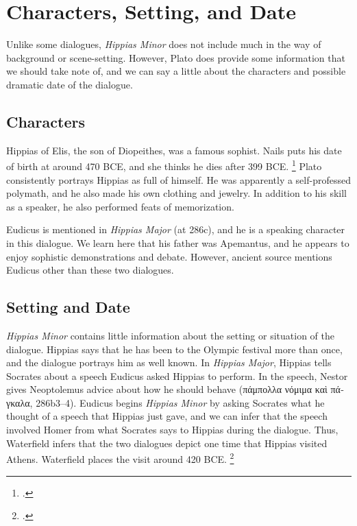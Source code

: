 \documentclass[12pt,letterpaper]{article}
\begin{document}

\pagestyle{notes}

\section{Characters, Setting, and Date}

Unlike some dialogues, \textit{Hippias Minor} does not include much in the way of background or scene-setting.
However, Plato does provide some information that we should take note of, and we can say a little about the characters and possible dramatic date of the dialogue.

\subsection{Characters}

Hippias of Elis, the son of Diopeithes, was a famous sophist.
Nails puts his date of birth at around 470 BCE, and she thinks he dies after 399 BCE.%
\footcite[][168]{nails2002-people-of-plato}
Plato consistently portrays Hippias as full of himself.
He was apparently a self-professed polymath, and he also made his own clothing and jewelry.
In addition to his skill as a speaker, he also performed feats of memorization.

Eudicus is mentioned in \textit{Hippias Major} (at 286c), and he is a speaking character in this dialogue.
We learn here that his father was Apemantus, and he appears to enjoy sophistic demonstrations and debate.
However, ancient source mentions Eudicus other than these two dialogues.

\subsection{Setting and Date}

\textit{Hippias Minor} contains little information about the setting or situation of the dialogue.
Hippias says that he has been to the Olympic festival more than once, and the dialogue portrays him as well known.
In \textit{Hippias Major}, Hippias tells Socrates about a speech Eudicus asked Hippias to perform.
In the speech, Nestor gives Neoptolemus advice about how he should behave (\textgreek{πάμπολλα νόμιμα καὶ πάγκαλα}, 286b3--4).
Eudicus begins \textit{Hippias Minor} by asking Socrates what he thought of a speech that Hippias just gave, and we can infer that the speech involved Homer from what Socrates says to Hippias during the dialogue.
Thus, Waterfield infers that the two dialogues depict one time that Hippias visited Athens.
Waterfield places the visit around 420 BCE.%
\footcite[][213]{waterfield-hippias-minor-1987}
\end{document}
